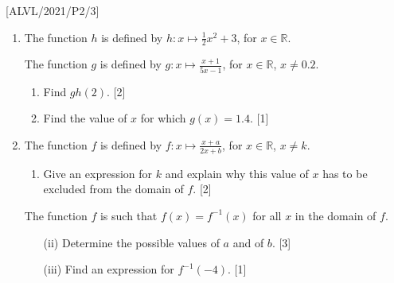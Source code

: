 \item {[}ALVL/2021/P2/3{]}
\begin{enumerate}
\item The function $h$ is defined by $h:x\mapsto\frac{1}{2}x^{2}+3$, for
$x\in\mathbb{R}$. 

The function $g$ is defined by $g:x\mapsto\frac{x+1}{5x-1}$, for
$x\in\mathbb{R}$, $x\ne0.2$. 
\begin{enumerate}
\item Find $gh(2)$. \hfill{} {[}2{]}
\item Find the value of $x$ for which $g(x)=1.4$. \hfill{}{[}1{]}
\end{enumerate}
\item The function $f$ is defined by $f:x\mapsto\frac{x+a}{2x+b}$, for
$x\in\mathbb{R}$, $x\neq k$. 
\begin{enumerate}
\item Give an expression for $k$ and explain why this value of $x$ has
to be excluded from the domain of $f$. \hfill{}{[}2{]}
\end{enumerate}
The function $f$ is such that $f(x)=f^{-1}(x)$ for all $x$ in the
domain of $f$. 
\begin{enumerate}
\item[(ii)]  Determine the possible values of $a$ and of $b$. \hfill{}{[}3{]}
\item[(iii)] Find an expression for $f^{-1}(-4)$. \hfill{}{[}1{]}
\end{enumerate}
\end{enumerate}
